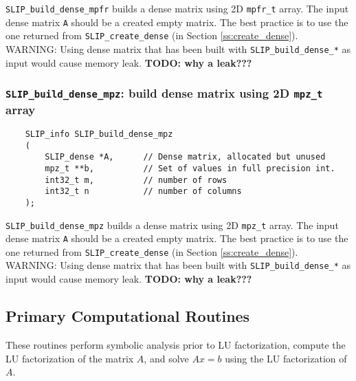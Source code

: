 \documentclass[12pt]{article}
\theoremstyle{definition}
\begin{document}
\verb|SLIP_build_dense_mpfr| builds a dense matrix using 2D \verb|mpfr_t|
array. The input dense matrix \verb|A| should be a created empty matrix.
The best practice is to use the one returned from \verb|SLIP_create_dense| (in
Section \ref{ss:create_dense}). WARNING: Using dense matrix that has been built
with \verb|SLIP_build_dense_*| as input would cause memory leak.
{\bf TODO: why a leak???} %

\cprotect\subsubsection{\verb|SLIP_build_dense_mpz|: build dense matrix using 2D \verb|mpz_t| array}
\label{s:user:build_dense_mpz}

\begin{mdframed}[userdefinedwidth=6in]
{\footnotesize
\begin{verbatim}
    SLIP_info SLIP_build_dense_mpz
    (
        SLIP_dense *A,      // Dense matrix, allocated but unused
        mpz_t **b,          // Set of values in full precision int.
        int32_t m,          // number of rows
        int32_t n           // number of columns
    );
\end{verbatim}
} \end{mdframed}

\verb|SLIP_build_dense_mpz| builds a dense matrix using 2D \verb|mpz_t| array.
The input dense matrix \verb|A| should be a created empty matrix. The
best practice is to use the one returned from \verb|SLIP_create_dense| (in
Section \ref{ss:create_dense}). WARNING: Using dense matrix that has been built
with \verb|SLIP_build_dense_*| as input would cause memory leak.
{\bf TODO: why a leak???} %

\subsection{Primary Computational Routines}

These routines perform symbolic analysis prior to LU factorization, compute the
LU factorization of the matrix $A$, and solve $Ax=b$ using the LU factorization
of $A$.
\end{document}
